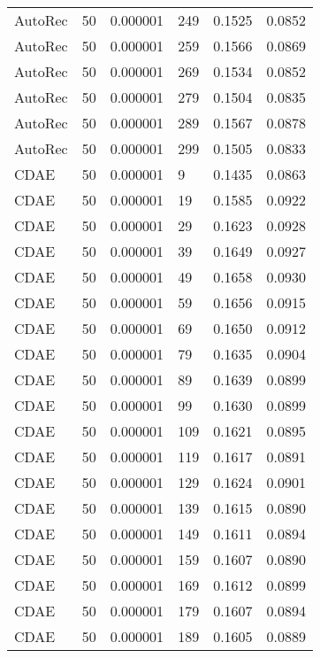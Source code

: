 \begin{tabular}{llrlrr}
 AutoRec &   50 &  0.000001 &   249 &  0.1525 &       0.0852 \\
 AutoRec &   50 &  0.000001 &   259 &  0.1566 &       0.0869 \\
 AutoRec &   50 &  0.000001 &   269 &  0.1534 &       0.0852 \\
 AutoRec &   50 &  0.000001 &   279 &  0.1504 &       0.0835 \\
 AutoRec &   50 &  0.000001 &   289 &  0.1567 &       0.0878 \\
 AutoRec &   50 &  0.000001 &   299 &  0.1505 &       0.0833 \\
    CDAE &   50 &  0.000001 &     9 &  0.1435 &       0.0863 \\
    CDAE &   50 &  0.000001 &    19 &  0.1585 &       0.0922 \\
    CDAE &   50 &  0.000001 &    29 &  0.1623 &       0.0928 \\
    CDAE &   50 &  0.000001 &    39 &  0.1649 &       0.0927 \\
    CDAE &   50 &  0.000001 &    49 &  0.1658 &       0.0930 \\
    CDAE &   50 &  0.000001 &    59 &  0.1656 &       0.0915 \\
    CDAE &   50 &  0.000001 &    69 &  0.1650 &       0.0912 \\
    CDAE &   50 &  0.000001 &    79 &  0.1635 &       0.0904 \\
    CDAE &   50 &  0.000001 &    89 &  0.1639 &       0.0899 \\
    CDAE &   50 &  0.000001 &    99 &  0.1630 &       0.0899 \\
    CDAE &   50 &  0.000001 &   109 &  0.1621 &       0.0895 \\
    CDAE &   50 &  0.000001 &   119 &  0.1617 &       0.0891 \\
    CDAE &   50 &  0.000001 &   129 &  0.1624 &       0.0901 \\
    CDAE &   50 &  0.000001 &   139 &  0.1615 &       0.0890 \\
    CDAE &   50 &  0.000001 &   149 &  0.1611 &       0.0894 \\
    CDAE &   50 &  0.000001 &   159 &  0.1607 &       0.0890 \\
    CDAE &   50 &  0.000001 &   169 &  0.1612 &       0.0899 \\
    CDAE &   50 &  0.000001 &   179 &  0.1607 &       0.0894 \\
    CDAE &   50 &  0.000001 &   189 &  0.1605 &       0.0889 \\

\end{tabular}

